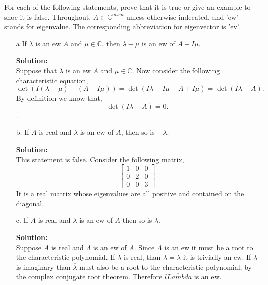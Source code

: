 \documentclass[12pt]{article}
\makeatletter
\theoremstyle{homework}
\newenvironment{exercise}[1]
{\def\@currentlabel{#1}\exercisecore}
{\endexercisecore}
\newcommand{\localhead}[1]{\par\smallskip\noindent\textbf{#1}\nobreak\\}%
\newcommand\solution{\localhead{Solution:}}
\newcommand{\Cplx}{\ensuremath{\mathbb C}}
\let\CC\Cplx
\makeatother
\begin{document}
\begin{exercise}{24.1} For each of the following statements, prove that it is true or give an example to shoe it is false. Throughout, $A\in \CC^{mxm}$ unless otherwise indecated, and 
  'ew' stands for eigenvalue. The corresponding abbreviation for eigenvector is 'ev'.\\
  \begin{enumerate}
    \item[a] If $\lambda$ is an ew $A$ and $\mu \in \CC$, then $\lambda - \mu$ is an ew of $A - I\mu$.\\
    \solution  Suppose that $\lambda$ is an ew $A$ and $\mu \in \CC$. Now consider the following characteristic equation, 
    \begin{equation*}
      \det(I(\lambda - \mu) - (A - I\mu)) = \det(I\lambda - I\mu - A + I\mu) = \det(I\lambda - A).
    \end{equation*} 
    By definition we know that,
    \begin{equation*}
      \det(I\lambda - A) = 0.
    \end{equation*}.
  \vspace{.15in}

  \item[b.] If $A$ is real and $\lambda$ is an ew of $A$, then so is $-\lambda$.\\
  \solution This statement is false. Consider the following matrix, 
  \begin{equation*}
    \begin{bmatrix}
      1 & 0 & 0\\
      0 & 2 & 0\\
      0 & 0 & 3
    \end{bmatrix}
  \end{equation*} 
  It is a real matrix whose eigenvalues are all positive and contained on the diagonal. 
  \vspace{.15in}

  \item[c.] If $A$ is real and $\lambda$ is an ew of $A$ then so is $\overline{\lambda}$. \\
  \solution Suppose $A$ is real and $\Lambda$ is an ew of $A$. Since $\Lambda$ is an ew it must be a root to the characteristic polynomial. 
  If $\lambda$ is real, than $\lambda = \overline{\lambda}$ it is trivially an ew. If $\lambda$ is imaginary than $\overline{\lambda}$ must also be 
  a root to the characteristic polynomial, by the complex conjugate root theorem. Therefore $\overline{lLambda}$ is an ew. 
  \vspace{.15in}


\end{enumerate}
\end{exercise}
\end{document}
